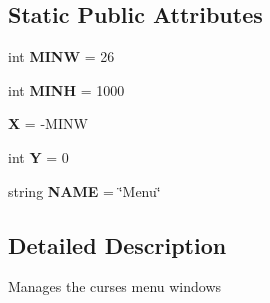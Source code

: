 \subsection*{\-Static \-Public \-Attributes}
\begin{DoxyCompactItemize}
\item 
\hypertarget{classplugins_1_1menucurses_1_1_menu_view_a99d43348385e7dd11331a64835c85c37}{int {\bfseries \-M\-I\-N\-W} = 26}\label{classplugins_1_1menucurses_1_1_menu_view_a99d43348385e7dd11331a64835c85c37}

\item 
\hypertarget{classplugins_1_1menucurses_1_1_menu_view_a36ac66e183d061b204fc4577c72714eb}{int {\bfseries \-M\-I\-N\-H} = 1000}\label{classplugins_1_1menucurses_1_1_menu_view_a36ac66e183d061b204fc4577c72714eb}

\item 
\hypertarget{classplugins_1_1menucurses_1_1_menu_view_a4617afe8e169e34c4e5591bcdee70e3f}{{\bfseries \-X} = -\/\-M\-I\-N\-W}\label{classplugins_1_1menucurses_1_1_menu_view_a4617afe8e169e34c4e5591bcdee70e3f}

\item 
\hypertarget{classplugins_1_1menucurses_1_1_menu_view_a39d4dec3e965eeee92c94cee428409b3}{int {\bfseries \-Y} = 0}\label{classplugins_1_1menucurses_1_1_menu_view_a39d4dec3e965eeee92c94cee428409b3}

\item 
\hypertarget{classplugins_1_1menucurses_1_1_menu_view_a2064c867e240683246e54a8ca551da6e}{string {\bfseries \-N\-A\-M\-E} = \char`\"{}\-Menu\char`\"{}}\label{classplugins_1_1menucurses_1_1_menu_view_a2064c867e240683246e54a8ca551da6e}

\end{DoxyCompactItemize}


\subsection{\-Detailed \-Description}
\begin{DoxyVerb}Manages the curses menu windows \end{DoxyVerb}
 

